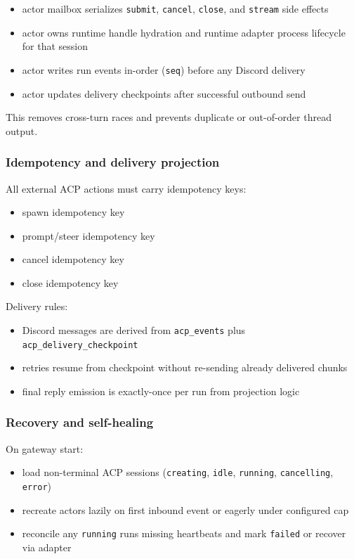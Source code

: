 \begin{itemize}
  \item actor mailbox serializes \texttt{submit}, \texttt{cancel}, \texttt{close}, and \texttt{stream} side effects
  \item actor owns runtime handle hydration and runtime adapter process lifecycle for that session
  \item actor writes run events in-order (\texttt{seq}) before any Discord delivery
  \item actor updates delivery checkpoints after successful outbound send
\end{itemize}


This removes cross-turn races and prevents duplicate or out-of-order thread output.

\subsubsection{Idempotency and delivery projection}


All external ACP actions must carry idempotency keys:

\begin{itemize}
  \item spawn idempotency key
  \item prompt/steer idempotency key
  \item cancel idempotency key
  \item close idempotency key
\end{itemize}


Delivery rules:

\begin{itemize}
  \item Discord messages are derived from \texttt{acp\_events} plus \texttt{acp\_delivery\_checkpoint}
  \item retries resume from checkpoint without re-sending already delivered chunks
  \item final reply emission is exactly-once per run from projection logic
\end{itemize}


\subsubsection{Recovery and self-healing}


On gateway start:

\begin{itemize}
  \item load non-terminal ACP sessions (\texttt{creating}, \texttt{idle}, \texttt{running}, \texttt{cancelling}, \texttt{error})
  \item recreate actors lazily on first inbound event or eagerly under configured cap
  \item reconcile any \texttt{running} runs missing heartbeats and mark \texttt{failed} or recover via adapter
\end{itemize}


